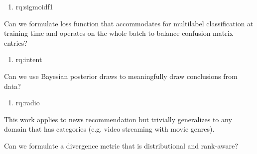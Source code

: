 \begin{enumerate}[label=\textbf{RQ\arabic*},ref={RQ\arabic*},resume,leftmargin=*]
	\item \acl{rq:sigmoidf1}\label{rq:sigmoidf1}
\end{enumerate}

Can we formulate loss function that accommodates for multilabel classification at training time and operates on the whole batch to balance confusion matrix entries?

\begin{enumerate}[label=\textbf{RQ\arabic*},ref={RQ\arabic*},resume,leftmargin=*]
	\item \acl{rq:intent}\label{rq:intent}
\end{enumerate}

Can we use Bayesian posterior draws to meaningfully draw conclusions from data?

\begin{enumerate}[label=\textbf{RQ\arabic*},ref={RQ\arabic*},resume,leftmargin=*]
	\item \acl{rq:radio}\label{rq:radio}
\end{enumerate}

This work applies to news recommendation but trivially generalizes to any domain that has categories (e.g. video streaming with movie genres).

Can we formulate a divergence metric that is distributional and rank-aware?











